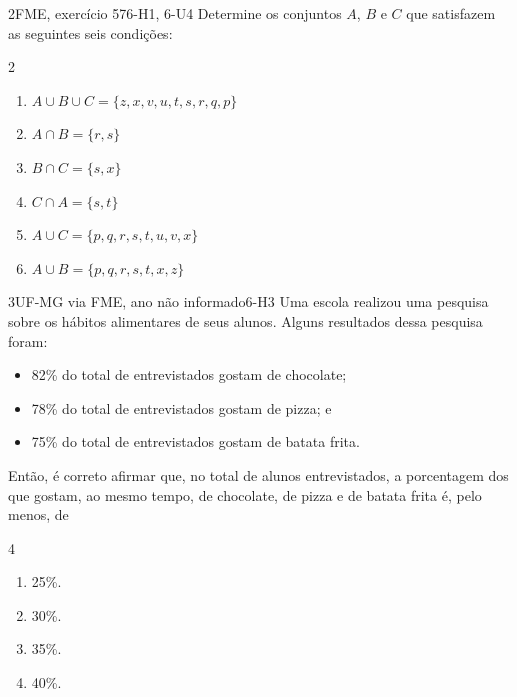 \begin{questao}{2}{FME, exercício 57}{6-H1, 6-U4}\label{u6:fme57}
Determine os conjuntos $A$, $B$ e $C$ que satisfazem as seguintes seis condições:
\begin{multicols}{2}
\begin{enumerate}[label=\arabic*.ª)]
  \item $A\cup B\cup C=\{z,x,v,u,t,s,r,q,p\}$
  \item $A\cap B=\{r,s\}$
  \item $B\cap C=\{s,x\}$
  \item $C\cap A=\{s,t\}$
  \item $A\cup C=\{p,q,r,s,t,u,v,x\}$
  \item $A\cup B=\{p,q,r,s,t,x,z\}$
\end{enumerate}
\end{multicols}
\end{questao}

\begin{questao}{3}{UF-MG via FME, ano não informado}{6-H3}\label{u6:ufmg37}
Uma escola realizou uma pesquisa sobre os hábitos alimentares de seus alunos. Alguns resultados dessa pesquisa foram:
\begin{itemize}[leftmargin=1.4em,itemsep=0pt]
  \item 82\% do total de entrevistados gostam de chocolate;
  \item 78\% do total de entrevistados gostam de pizza; e
  \item 75\% do total de entrevistados gostam de batata frita.
\end{itemize}
Então, é correto afirmar que, no total de alunos entrevistados, a porcentagem dos que gostam, ao mesmo tempo, de chocolate, de pizza e de batata frita é, pelo menos, de
\begin{multicols}{4}
\begin{enumerate}[label=\alph*)]
  \item 25\%.
  \item 30\%.
  \item 35\%.
  \item 40\%.
\end{enumerate}
\end{multicols}
\end{questao}

